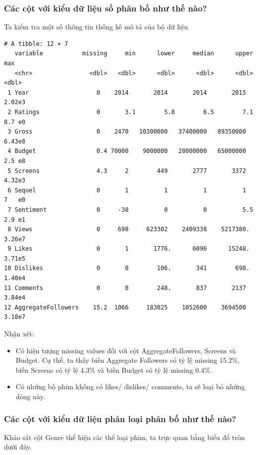 \subsubsection{Các cột với kiểu dữ liệu số phân bố như thế nào?}

Ta kiểm tra một số thông tin thống kê mô tả của bộ dữ liệu

\begin{verbatim}
# A tibble: 12 × 7
   variable           missing     min      lower     median      upper       max
   <chr>                <dbl>   <dbl>      <dbl>      <dbl>      <dbl>     <dbl>
 1 Year                   0    2014       2014       2014       2015      2.02e3
 2 Ratings                0       3.1        5.8        6.5        7.1    8.7 e0
 3 Gross                  0    2470   10300000   37400000   89350000      6.43e8
 4 Budget                 0.4 70000    9000000   28000000   65000000      2.5 e8
 5 Screens                4.3     2        449       2777       3372      4.32e3
 6 Sequel                 0       1          1          1          1      7   e0
 7 Sentiment              0     -38          0          0          5.5    2.9 e1
 8 Views                  0     698     623302    2409338    5217380.     3.26e7
 9 Likes                  0       1       1776.      6096      15248.     3.71e5
10 Dislikes               0       0        106.       341        698.     1.40e4
11 Comments               0       0        248.       837       2137      3.84e4
12 AggregateFollowers    15.2  1066     183025    1052600    3694500      3.10e7
\end{verbatim}
Nhận xét:
\begin{itemize}
    \item Có hiện tượng missing values đối với cột AggregateFollowers, Screens và Budget. Cụ thể, ta thấy biến Aggregate Followers có tỷ lệ missing 15.2\%, biến Screens có tỷ lệ 4.3\% và biến Budget có tỷ lệ missing 0.4\%.
    \item  Có những bộ phim không có likes/ dislikes/ comments, ta sẽ loại bỏ những dòng này.
\end{itemize}

\subsubsection{Các cột với kiểu dữ liệu phân loại phân bố như thế nào?}

Khảo sát cột Genre thể hiện các thể loại phim, ta trực quan bằng biểu đổ tròn dưới đây.


